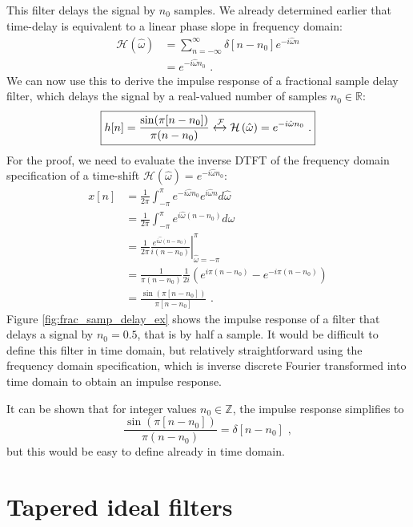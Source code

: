 This filter delays the signal by $n_0$ samples. We already determined earlier that time-delay
is equivalent to a linear phase slope in
frequency domain:
\begin{align}
  \mathcal{H}(\hat{\omega}) & = \sum_{n=-\infty}^{\infty}\delta[n-n_0]e^{-i\hat{\omega}n} \\
                            & =e^{-i\hat{\omega}n_0}\,\,.
\end{align}
We can now use this to derive the impulse response of a fractional sample delay filter,
which delays the signal by a real-valued number of samples $n_0 \in \mathbb{R}$:
\begin{equation}
  \boxed{
    h[n] =\frac{\sin(\pi[n-n_0])}{\pi(n-n_0)} \xleftrightarrow{\mathcal{F}} \mathcal{H}\left(\hat{\omega}\right) = e^{-i\hat{\omega}n_0}\,\,.
  }
\end{equation}
For the proof, we need to evaluate the inverse DTFT of the frequency domain specification of a time-shift
$\mathcal{H}(\hat{\omega})=e^{-i\hat{\omega}n_0}$:
\begin{align}
  x[n] & = \frac{1}{2\pi}\int_{-\pi}^{\pi} e^{-i\hat{\omega}n_0} e^{i\hat{\omega}n}d\hat{\omega}               \\
       & = \frac{1}{2\pi}\int_{-\pi}^{\pi}  e^{i\hat{\omega}(n-n_0)}d\hat{\omega}                              \\
       & =\left.\frac{1}{2\pi} \frac{e^{i\hat{\omega}(n-n_0)}}{i(n-n_0)}\right \vert_{\hat{\omega}=-\pi}^{\pi} \\
       & = \frac{1}{\pi(n-n_0)}\frac{1}{2i}(e^{i\pi(n-n_0)}-e^{-i\pi(n-n_0)})                                  \\
       & = \frac{\sin(\pi[n-n_0])}{\pi[n-n_0]}\,\,.
\end{align}
Figure \ref{fig:frac_samp_delay_ex} shows the impulse response of a
filter that delays a signal by $n_0=0.5$, that is by half a sample. It
would be difficult to define this filter in time domain, but
relatively straightforward using the frequency domain specification,
which is inverse discrete Fourier transformed into time domain to obtain
an impulse response.

It can be shown that for integer values $n_0 \in \mathbb{Z}$, the
impulse response simplifies to
\begin{equation}
  \frac{\sin(\pi[n-n_0])}{\pi(n-n_0)}=\delta[n-n_0]\,\,,
\end{equation}
but this would be easy to define already in time domain.


\section{Tapered ideal filters}

